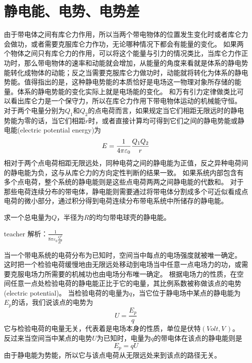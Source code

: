 \section{静电能、电势、电势差}
由于带电体之间有库仑力作用，所以当两个带电物体的位置发生变化时或者库仑力会做功，或者需要克服库仑力作功，无论哪种情况下都会有能量的变化。
如果两个物体之间只有库仑力的作用，可以将这个能量与引力的情况类比，当库仑力作正功时，那么带电物体的速率和动能就会增加，从能量的角度来看就是体系的静电势能转化成物体的动能；反之当需要克服库仑力做功时，动能就将转化为体系的静电势能。值得指出的是，这种静电势能的本质恰好是电场这一物理对象所存储的能量。体系的静电势能的变化实际上就是电场能的变化。
和万有引力定律做类比可以看出库仑力是一个保守力，所以在库仑力作用下带电物体运动的机械能守恒。
对于两个电量分别为$Q_1$和$Q_2$的点电荷而言，如果规定当它们相距无限远时的静电势能为零的话，当它们相距$r$时，或者直接计算均可得到它们之间的静电势能或{\heiti 静电能}(electric potential energy)为
\begin{equation}
E = \frac{1}{4\pi\varepsilon_0} \frac{Q_1Q_2}{ r}
\end{equation}
相对于两个点电荷相距无限远处，同种电荷之间的静电能为正值，反之异种电荷间的静电能为负，这与从库仑力的方向定性判断的结果一致。
如果系统内部包含有多个点电荷，整个系统的静电能则是这些点电荷两两之间静电能的代数和。
对于那些电荷连续分布的带电体，静电能则需要通过将带电体分割成多个可近似看成点电荷的微小部分，通过积分得到电荷连续分布带电系统中所储存的静电能。




\begin{example}
求一个总电量为$Q$，半径为$R$的均匀带电球壳的静电能。
\begin{taggedblock}{teacher}
\newline
解析：$\frac{1}{8\pi\varepsilon_0\frac{Q^2}{R^2}}$
\end{taggedblock}
\end{example}

当一个带电系统的电荷分布为已知时，空间当中每点的电场强度就被唯一确定。
这时把一个检验电荷缓慢地由无限远处移动到电场当中任意一点电场力的功，或需要克服电场力所需要的机械功也由电场分布唯一确定。
根据电场力的性质，在空间任意一点处检验电荷的静电能正比于它的电量，其比例系数被称做该点的{\heiti 电势}(electric potential)。
当检验电荷的电量为$q$，当它位于静电场中某点的静电能为$E_p$的话，我们说该点的电势为
\begin{equation}
 U = \frac{E_p}{q}
\end{equation}
它与检验电荷的电量无关，代表着是电场本身的性质，单位是伏特$(\unit{Volt}, \unit{V}\,)$。
反过来当空间当中某点的电势$U$为已知时，电量为$q$的带电体在该点的静电能则是
\begin{equation}
E_p = q U
\end{equation}
由于静电能为势能，所以它与该点电荷从无限远处来到该点的路径无关。

